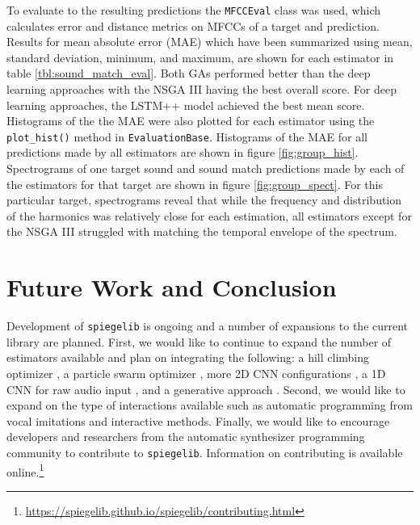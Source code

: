 To evaluate to the resulting predictions the \texttt{MFCCEval} class was used, which calculates error and distance metrics on MFCCs of a target and prediction. Results for mean absolute error (MAE) which have been summarized using mean, standard deviation, minimum, and maximum, are shown for each estimator in table \ref{tbl:sound_match_eval}. Both GAs performed better than the deep learning approaches with the NSGA III having the best overall score. For deep learning approaches, the LSTM++ model achieved the best mean score. Histograms of the the MAE were also plotted for each estimator using the \texttt{plot_hist()} method in \texttt{EvaluationBase}. Histograms of the MAE for all predictions made by all estimators are shown in figure \ref{fig:group_hist}. Spectrograms of one target sound and sound match predictions made by each of the estimators for that target are shown in figure \ref{fig:group_spect}. For this particular target, spectrograms reveal that while the frequency and distribution of the harmonics was relatively close for each estimation, all estimators except for the NSGA III struggled with matching the temporal envelope of the spectrum.


\section{Future Work and Conclusion}
Development of \texttt{spiegelib} is ongoing and a number of expansions to the current library are planned. First, we would like to continue to expand the number of estimators available and plan on integrating the following: a hill climbing optimizer \cite{yee2018automatic}, a particle swarm optimizer \cite{heise2009automatic}, more 2D CNN configurations \cite{barkan2019inversynth}, a 1D CNN for raw audio input \cite{barkan2019inversynth}, and a generative approach \cite{esling2020flow}.  Second, we would like to expand on the type of interactions available such as automatic programming from vocal imitations \cite{mcartwright2014} and interactive methods. 
Finally, we would like to encourage developers and researchers from the automatic synthesizer programming community to contribute to \texttt{spiegelib}. Information on contributing is available online.\footnote{\url{https://spiegelib.github.io/spiegelib/contributing.html}} 

